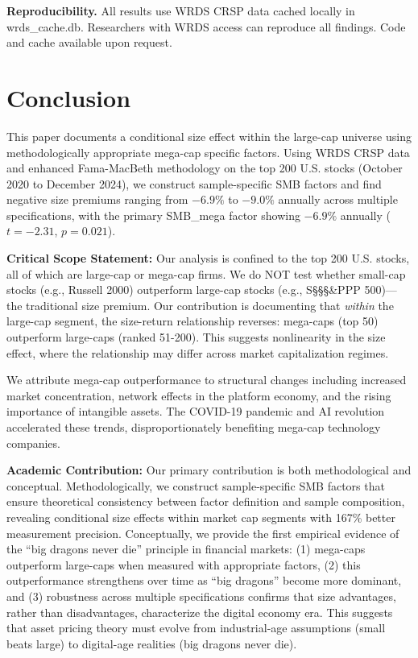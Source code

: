 \documentclass[10pt,letterpaper]{article}
\begin{document}
\textbf{Reproducibility.} All results use WRDS CRSP data cached locally in wrds\_cache.db. Researchers with WRDS access can reproduce all findings. Code and cache available upon request.

\section*{Conclusion}

This paper documents a conditional size effect within the large-cap universe using methodologically appropriate mega-cap specific factors. Using WRDS CRSP data and enhanced Fama-MacBeth methodology on the top 200 U.S. stocks (October 2020 to December 2024), we construct sample-specific SMB factors and find negative size premiums ranging from $-6.9\%$ to $-9.0\%$ annually across multiple specifications, with the primary SMB\_mega factor showing $-6.9\%$ annually ($t=-2.31$, $p=0.021$).

\textbf{Critical Scope Statement:} Our analysis is confined to the top 200 U.S. stocks, all of which are large-cap or mega-cap firms. We do NOT test whether small-cap stocks (e.g., Russell 2000) outperform large-cap stocks (e.g., S\S\S\S\&PPP 500)---the traditional size premium. Our contribution is documenting that \textit{within} the large-cap segment, the size-return relationship reverses: mega-caps (top 50) outperform large-caps (ranked 51-200). This suggests nonlinearity in the size effect, where the relationship may differ across market capitalization regimes.

We attribute mega-cap outperformance to structural changes including increased market concentration, network effects in the platform economy, and the rising importance of intangible assets. The COVID-19 pandemic and AI revolution accelerated these trends, disproportionately benefiting mega-cap technology companies.

\textbf{Academic Contribution:} Our primary contribution is both methodological and conceptual. Methodologically, we construct sample-specific SMB factors that ensure theoretical consistency between factor definition and sample composition, revealing conditional size effects within market cap segments with 167\% better measurement precision. Conceptually, we provide the first empirical evidence of the ``big dragons never die'' principle in financial markets: (1) mega-caps outperform large-caps when measured with appropriate factors, (2) this outperformance strengthens over time as ``big dragons'' become more dominant, and (3) robustness across multiple specifications confirms that size advantages, rather than disadvantages, characterize the digital economy era. This suggests that asset pricing theory must evolve from industrial-age assumptions (small beats large) to digital-age realities (big dragons never die).
\end{document}

